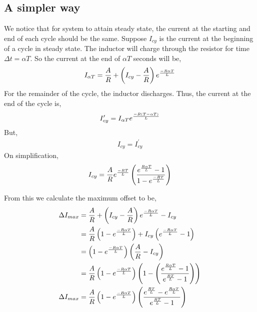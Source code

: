     \subsection{A simpler way}
    We notice that for system to attain steady state, the current at the starting and end of each cycle should be the same.
    Suppose $I_{cy}$ is the current at the beginning of a cycle in steady state. The inductor will charge through the resistor for time $\Delta t = \alpha T$. So the current at the end of $\alpha T$ seconds will be,
    \begin{align*}
        I_{\alpha T} = \frac{A}{R} + \left(I_{cy} - \frac{A}{R}\right)e^{\frac{-R\alpha T}{L}}
    \end{align*}
    For the remainder of the cycle, the inductor discharges. Thus, the current at the end of the cycle is,
    \begin{align*}
        I_{cy}^{\prime} = I_{\alpha T}e^{\frac{-R\left(T-\alpha T\right)}{L}}\\
    \end{align*}
    But,
    \begin{align*}
        I_{cy} = I_{cy}^\prime 
    \end{align*}
    On simplification, 
    \begin{align*}
        I_{cy} = \frac{A}{R}e^{\frac{-RT}{L}}\left(\frac{e^{\frac{R\alpha T}{L}} - 1}{1-e^{\frac{-RT}{L}}}\right)
    \end{align*}

    From this we calculate the maximum offset to be,
    \begin{align*}
       \Delta I_{max} &= \frac{A}{R} + \left(I_{cy} - \frac{A}{R}\right)e^{\frac{-R\alpha T}{L}} - I_{cy}\\
        &= \frac{A}{R}\left(1 - e^{\frac{-R\alpha T}{L}}\right) + I_{cy}\left(e^{\frac{-R\alpha T}{L}} - 1\right) \\
        &= \left(1 - e^{\frac{-R\alpha T}{L}}\right)\left(\frac{A}{R} - I_{cy}\right)\\
        &=\frac{A}{R}\left(1 - e^{\frac{-R\alpha T}{L}}\right)\left(1 - \left(\frac{e^{\frac{R\alpha T}{L}} - 1}{e^{\frac{RT}{L}} - 1}\right)\right)\\
        \Delta I_{max} &=\frac{A}{R}\left(1 - e^{\frac{-R\alpha T}{L}}\right) \left(\frac{e^{\frac{RT}{L}}-e^{\frac{R\alpha T}{L}}}{e^{\frac{RT}{L}} - 1}\right)\\
    \end{align*}

